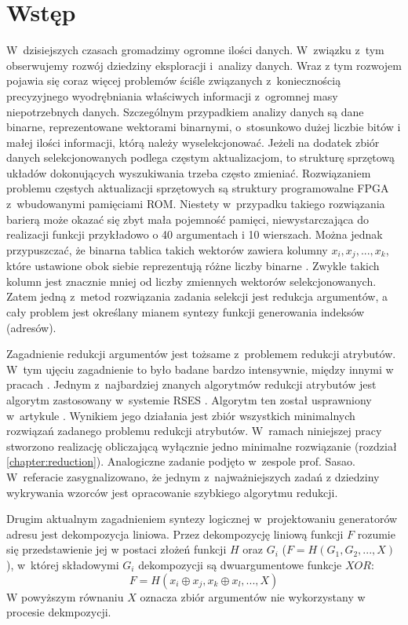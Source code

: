 \chapter{Wstęp}

W~dzisiejszych czasach gromadzimy ogromne ilości danych.
W~związku z~tym obserwujemy rozwój dziedziny eksploracji i~analizy danych.
Wraz z tym rozwojem pojawia się coraz więcej problemów ściśle związanych z~koniecznością precyzyjnego wyodrębniania właściwych informacji z~ogromnej masy niepotrzebnych danych.
Szczególnym przypadkiem analizy danych są dane binarne, reprezentowane wektorami binarnymi, o~stosunkowo dużej liczbie bitów i małej ilości informacji,
którą należy wyselekcjonować.
Jeżeli na dodatek zbiór danych selekcjonowanych podlega częstym aktualizacjom,
to strukturę sprzętową układów dokonujących wyszukiwania trzeba często zmieniać.
Rozwiązaniem problemu częstych aktualizacji sprzętowych są struktury programowalne FPGA z~wbudowanymi pamięciami ROM.
Niestety w~przypadku takiego rozwiązania barierą może okazać się zbyt mała pojemność pamięci,
niewystarczająca do realizacji funkcji przykładowo o 40 argumentach i 10 wierszach.
Można jednak przypuszczać, że binarna tablica takich wektorów zawiera kolumny $x_i, x_j, ..., x_k$,
które ustawione obok siebie reprezentują różne liczby binarne \cite{sasao-workshop}.
Zwykle takich kolumn jest znacznie mniej od liczby zmiennych wektorów selekcjonowanych.
Zatem jedną z~metod rozwiązania zadania selekcji jest redukcja argumentów,
a cały problem jest określany mianem syntezy funkcji generowania indeksów (adresów).

Zagadnienie redukcji argumentów jest tożsame z~problemem redukcji atrybutów.
W~tym ujęciu zagadnienie to było badane bardzo intensywnie, między innymi w pracach \cite{fast-algorithm, efektywna-procedura, new-reduction, steinbach-posthoff, skowron-rauszer, slezak, novel-method}.
Jednym z~najbardziej znanych algorytmów redukcji atrybutów jest algorytm zastosowany w~systemie RSES \cite{rses}.
Algorytm ten został usprawniony w~artykule \cite{efektywna-procedura}.
Wynikiem jego działania jest zbiór wszystkich minimalnych rozwiązań zadanego problemu redukcji atrybutów.
W~ramach niniejszej pracy stworzono realizację obliczającą wyłącznie jedno minimalne rozwiązanie (rozdział \ref{chapter:reduction}).
Analogiczne zadanie podjęto w~zespole prof. Sasao.
W~referacie \cite{sasao-workshop} zasygnalizowano,
że jednym z~najważniejszych zadań z dziedziny wykrywania wzorców jest opracowanie szybkiego algorytmu redukcji.

Drugim aktualnym zagadnieniem syntezy logicznej w~projektowaniu generatorów adresu jest dekompozycja liniowa.
Przez dekompozycję liniową funkcji $F$ rozumie się przedstawienie jej w postaci złożeń funkcji $H$ oraz $G_i$ ($F = H(G_1, G_2, ...,  X)$),
w~której składowymi $G_i$ dekompozycji są dwuargumentowe funkcje $XOR$:
\begin{equation}
F = H (x_i \oplus x_j, x_k \oplus x_l, ..., X)
\end{equation}
W powyższym równaniu $X$ oznacza zbiór argumentów nie wykorzystany w procesie dekmpozycji.

